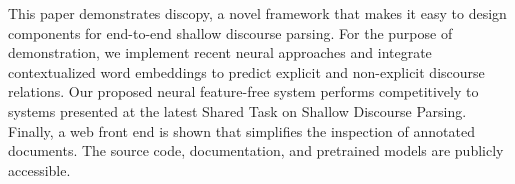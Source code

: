 This paper demonstrates discopy, a novel framework that makes it easy to design components for end-to-end shallow discourse parsing. For the purpose of demonstration, we implement recent neural approaches and integrate contextualized word embeddings to predict explicit and non-explicit discourse relations. Our proposed neural feature-free system performs competitively to systems presented at the latest Shared Task on Shallow Discourse Parsing. Finally, a web front end is shown that simplifies the inspection of annotated documents. The source code, documentation, and pretrained models are publicly accessible.
